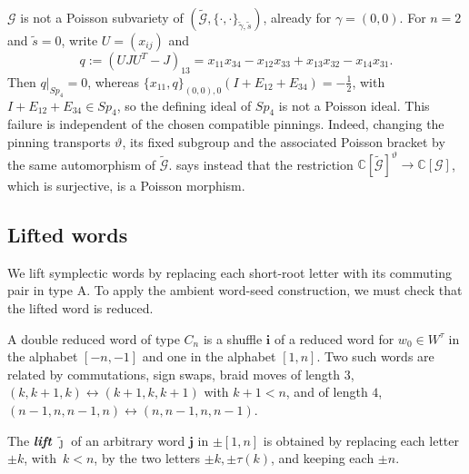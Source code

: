 \documentclass[a4paper]{amsart}
\numberwithin{equation}{section}
\theoremstyle{definition}
\theoremstyle{remark}
\newcommand{\bbC}{\mathbb{C}}
\newcommand{\mcG}{\mathcal{G}}
\newcommand{\bfi}{\mathbf{i}}
\newcommand{\bfj}{\mathbf{j}}
\newcommand{\tG}{\widetilde{\mcG}}
\newcommand{\tg}{\widetilde{\gamma}}
\newcommand{\vt}{\vartheta}
\newcommand{\newword}[1]{\textbf{\emph{#1}}}
\begin{document}
\begin{remark}
  \label{rmk: not Poisson subvariety}
  $\mcG$ is not a Poisson subvariety of $(\tG,\{\cdot,\cdot\}_{\tg,\widetilde{s}})$, already for $\gamma=(0,0)$.
  For $n=2$ and $\widetilde{s}=0$, write $U=(x_{ij})$ and
  \[
    q:=(UJU^T-J)_{13}=x_{11}x_{34}-x_{12}x_{33}+x_{13}x_{32}-x_{14}x_{31}.
  \]
  Then $q|_{Sp_4}=0$, whereas $\{x_{11},q\}_{(0,0),0}(I+E_{12}+E_{34})=-\tfrac12$, with $I+E_{12}+E_{34}\in Sp_4$, so the defining ideal of $Sp_4$ is not a Poisson ideal.
  This failure is independent of the chosen compatible pinnings.
  Indeed, changing the pinning transports $\vt$, its fixed subgroup and the associated Poisson bracket by the same automorphism of $\tG$.
   says instead that the restriction $\bbC[\tG]^\vt\to\bbC[\mcG]$, which is surjective, is a Poisson morphism.
\end{remark}

\subsection{Lifted words}
We lift symplectic words by replacing each short-root letter with its commuting pair in type A. To apply the ambient word-seed construction, we must check that the lifted word is reduced.

A double reduced word of type $C_n$ is a shuffle $\bfi$ of a reduced word for $w_0\in W^\tau$ in the alphabet $[-n,-1]$ and one in the alphabet $[1,n]$.
Two such words are related by commutations, sign swaps, braid moves of length $3$, $(k,k+1,k)\leftrightarrow(k+1,k,k+1)$ with $k+1<n$, and of length $4$, $(n-1,n,n-1,n)\leftrightarrow(n,n-1,n,n-1)$.

\begin{definition}
  \label{def: lifted word}
  The \newword{lift} $\widetilde{\boldsymbol{\jmath}}$ of an arbitrary word $\bfj$ in $\pm[1,n]$ is obtained by replacing each letter $\pm k$, with~$k<n$, by the two letters $\pm k,\pm\tau(k)$, and keeping each $\pm n$.
\end{definition}
\end{document}
